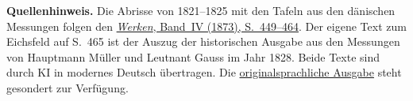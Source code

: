 \par{}\medskip\begin{small}\noindent\textbf{Quellenhinweis.} Die Abrisse von 1821--1825 mit den Tafeln aus den dänischen Messungen folgen den \href{https://gdz.sub.uni-goettingen.de/id/PPN236005081}{\textit{Werken}, Band~IV (1873), S.~449--464}. Der eigene Text zum Eichsfeld auf S.~465 ist der Auszug der historischen Ausgabe aus den Messungen von Hauptmann Müller und Leutnant Gauss im Jahr 1828. Beide Texte sind durch KI in modernes Deutsch übertragen. Die \href{https://github.com/KokunoYumeto/gauss-collected-works/releases/tag/gauss-original-language-2026-10-24}{originalsprachliche Ausgabe} steht gesondert zur Verfügung.\par\end{small}
